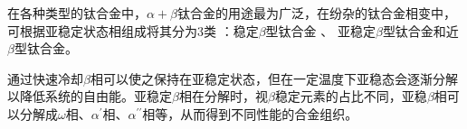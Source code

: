 
在各种类型的钛合金中，$\alpha+\beta$钛合金的用途最为广泛，在纷杂的钛合金相变中，可根据亚稳定状态相组成将其分为3类 ：稳定$\beta$型钛合金 、 亚稳定$\beta$型钛合金和近$\beta$型钛合金。

通过快速冷却$\beta$相可以使之保持在亚稳定状态，但在一定温度下亚稳态会逐渐分解以降低系统的自由能。亚稳定$\beta$相在分解时，视$ \beta $稳定元素的占比不同，亚稳$ \beta $相可以分解成$ \omega $相、$ \alpha^{\prime} $相、$ \alpha^{\prime\prime} $相等，从而得到不同性能的合金组织。

